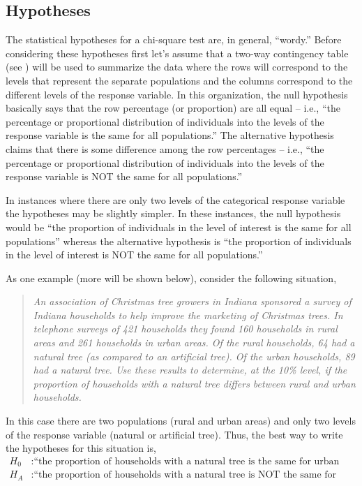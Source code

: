 \documentclass[10pt,openany]{book}\usepackage[]{graphicx}\usepackage[]{color}
\begin{document}
\subsection{Hypotheses}
The statistical hypotheses for a chi-square test are, in general, ``wordy.''  Before considering these hypotheses first let's assume that a two-way contingency table (see ) will be used to summarize the data where the rows will correspond to the levels that represent the separate populations and the columns correspond to the different levels of the response variable.  In this organization, the null hypothesis basically says that the row percentage (or proportion) are all equal -- i.e., ``the percentage or proportional distribution of individuals into the levels of the response variable is the same for all populations.''  The alternative hypothesis claims that there is some difference among the row percentages -- i.e., ``the percentage or proportional distribution of individuals into the levels of the response variable is NOT the same for all populations.''

In instances where there are only two levels of the categorical response variable the hypotheses may be slightly simpler.  In these instances, the null hypothesis would be ``the proportion of individuals in the level of interest is the same for all populations'' whereas the alternative hypothesis is ``the proportion of individuals in the level of interest is NOT the same for all populations.''

As one example (more will be shown below), consider the following situation,

\begin{quote}
\textsl{An association of Christmas tree growers in Indiana sponsored a survey of Indiana households to help improve the marketing of Christmas trees.  In telephone surveys of 421 households they found 160 households in rural areas and 261 households in urban areas.  Of the rural households, 64 had a natural tree (as compared to an artificial tree).  Of the urban households, 89 had a natural tree.  Use these results to determine, at the 10\% level, if the proportion of households with a natural tree differs between rural and urban households.}
\end{quote}

In this case there are two populations (rural and urban areas) and only two levels of the response variable (natural or artificial tree).  Thus, the best way to write the hypotheses for this situation is,
\[ \begin{split}
  H_{0}&: \text{``the proportion of households with a natural tree is the same for urban and rural households''} \\
  H_{A}&: \text{``the proportion of households with a natural tree is NOT the same for urban and rural households''}
\end{split} \]
\end{document}
